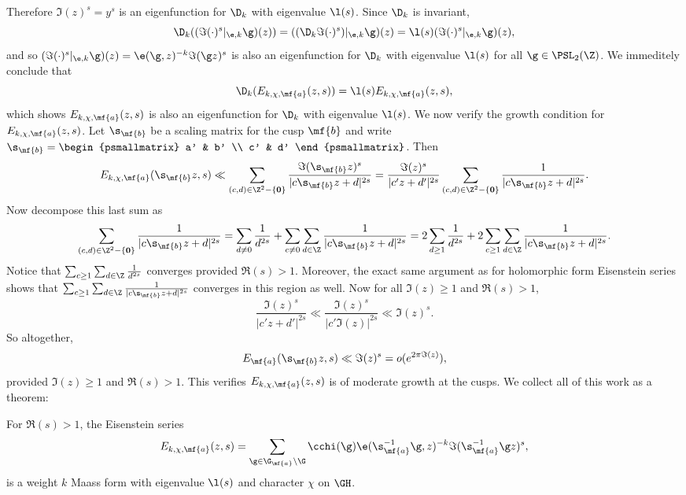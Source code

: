     Therefore $\Im(z)^{s} = y^{s}$ is an eigenfunction for $\D_{k}$ with eigenvalue $\l(s)$. Since $\D_{k}$ is invariant,
    \[
      \D_{k}((\Im(\cdot)^{s}|_{\e,k}\g)(z)) = ((\D_{k}\Im(\cdot)^{s})|_{\e,k}\g)(z) = \l(s)(\Im(\cdot)^{s}|_{\e,k}\g)(z),
    \]
    and so $(\Im(\cdot)^{s}|_{\e,k}\g)(z) = \e(\g,z)^{-k}\Im(\g z)^{s}$ is also an eigenfunction for $\D_{k}$ with eigenvalue $\l(s)$ for all $\g \in \PSL_{2}(\Z)$. We immeditely conclude that
    \[
      \D_{k}(E_{k,\chi,\mf{a}}(z,s)) = \l(s)E_{k,\chi,\mf{a}}(z,s),
    \]
    which shows $E_{k,\chi,\mf{a}}(z,s)$ is also an eigenfunction for $\D_{k}$ with eigenvalue $\l(s)$. We now verify the growth condition for $E_{k,\chi,\mf{a}}(z,s)$. Let $\s_{\mf{b}}$ be a scaling matrix for the cusp $\mf{b}$ and write $\s_{\mf{b}} = \begin{psmallmatrix} a' & b' \\ c' & d' \end{psmallmatrix}$. Then
    \[
      E_{k,\chi,\mf{a}}(\s_{\mf{b}}z,s) \ll \sum_{(c,d) \in \Z^{2}-\{\mathbf{0}\}}\frac{\Im(\s_{\mf{b}}z)^{s}}{|c\s_{\mf{b}}z+d|^{2s}} = \frac{\Im(z)^{s}}{|c'z+d'|^{2s}}\sum_{(c,d) \in \Z^{2}-\{\mathbf{0}\}}\frac{1}{|c\s_{\mf{b}}z+d|^{2s}}.
    \]
    Now decompose this last sum as
    \[
      \sum_{(c,d) \in \Z^{2}-\{\mathbf{0}\}}\frac{1}{|c\s_{\mf{b}}z+d|^{2s}} = \sum_{d \neq 0}\frac{1}{d^{2s}}+\sum_{c \neq 0}\sum_{d \in \Z}\frac{1}{|c\s_{\mf{b}}z+d|^{2s}} = 2\sum_{d \ge 1}\frac{1}{d^{2s}}+2\sum_{c \ge 1}\sum_{d \in \Z}\frac{1}{|c\s_{\mf{b}}z+d|^{2s}}.
    \]
    Notice that $\sum_{c \ge 1}\sum_{d \in \Z}\frac{1}{d^{2s}}$ converges provided $\Re(s) > 1$. Moreover, the exact same argument as for holomorphic form Eisenstein series shows that $\sum_{c \ge 1}\sum_{d \in \Z}\frac{1}{|c\s_{\mf{b}}z+d|^{2s}}$ converges in this region as well. Now for all $\Im(z) \ge 1$ and $\Re(s) > 1$,
    \[
      \frac{\Im(z)^{s}}{|c'z+d'|^{2s}} \ll \frac{\Im(z)^{s}}{|c'\Im(z)|^{2s}} \ll \Im(z)^{s}.
    \]
    So altogether,
    \[
      E_{\mf{a}}(\s_{\mf{b}}z,s) \ll \Im(z)^{s} = o(e^{2\pi\Im(z)}),
    \]
    provided $\Im(z) \ge 1$ and $\Re(s) > 1$. This verifies $E_{k,\chi,\mf{a}}(z,s)$ is of moderate growth at the cusps. We collect all of this work as a theorem:

    \begin{theorem}
      For $\Re(s) > 1$, the Eisenstein series
      \[
          E_{k,\chi,\mf{a}}(z,s) = \sum_{\g \in \G_{\mf{a}}\backslash\G}\cchi(\g)\e(\s_{\mf{a}}^{-1}\g,z)^{-k}\Im(\s_{\mf{a}}^{-1}\g z)^{s},
      \]
      is a weight $k$ Maass form with eigenvalue $\l(s)$ and character $\chi$ on $\GH$.
    \end{theorem}

